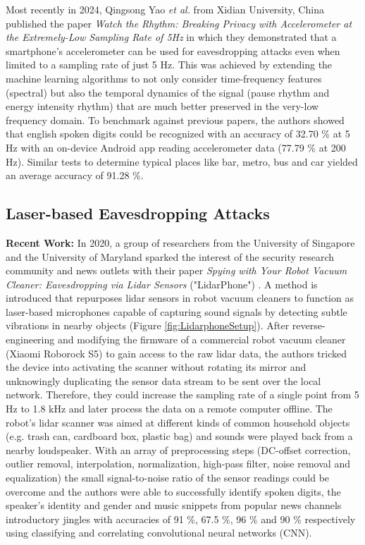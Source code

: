 \documentclass[sigconf, nonacm]{acmart}
\begin{document}
Most recently in 2024, Qingsong Yao \textit{et al.} from Xidian University, China published the paper \textit{Watch the Rhythm: Breaking Privacy with Accelerometer at the Extremely-Low Sampling Rate of 5Hz} \cite{WatchTheRhythm2024} in which they demonstrated that a smartphone's accelerometer can be used for eavesdropping attacks even when limited to a sampling rate of just 5 Hz.
This was achieved by extending the machine learning algorithms to not only consider time-frequency features (spectral) but also the temporal dynamics of the signal (pause rhythm and energy intensity rhythm) that are much better preserved in the very-low frequency domain.
To benchmark against previous papers, the authors showed that english spoken digits could be recognized with an accuracy of 32.70 \% at 5 Hz with an on-device Android app reading accelerometer data (77.79 \% at 200 Hz).
Similar tests to determine typical places like bar, metro, bus and car yielded an average accuracy of 91.28 \%.

\subsection{Laser-based Eavesdropping Attacks}

\textbf{Recent Work:} In 2020, a group of researchers from the University of Singapore and the University of Maryland sparked the interest of the security research community \cite{BitdefenderRobotVacuumEavesdrop} and news outlets \cite{ForbesRobotVacuumEavesdrop} with their paper \textit{Spying with Your Robot Vacuum Cleaner: Eavesdropping via Lidar Sensors} ("LidarPhone") \cite{LidarPhone2020}. A method is introduced that repurposes lidar sensors in robot vacuum cleaners to function as laser-based microphones capable of capturing sound signals by detecting subtle vibrations in nearby objects (Figure \ref{fig:LidarphoneSetup}).
After reverse-engineering and modifying the firmware of a commercial robot vacuum cleaner (Xiaomi Roborock S5) to gain access to the raw lidar data, the authors tricked the device into activating the scanner without rotating its mirror and unknowingly duplicating the sensor data stream to be sent over the local network. Therefore, they could increase the sampling rate of a single point from 5 Hz to 1.8 kHz and later process the data on a remote computer offline.
The robot's lidar scanner was aimed at different kinds of common household objects (e.g. trash can, cardboard box, plastic bag) and sounds were played back from a nearby loudspeaker.
With an array of preprocessing steps (DC-offset correction, outlier removal, interpolation, normalization, high-pass filter, noise removal and equalization) the small signal-to-noise ratio of the sensor readings could be overcome and the authors were able to successfully identify spoken digits, the speaker's identity and gender and music snippets from popular news channels introductory jingles with accuracies of 91 \%, 67.5 \%, 96 \% and 90 \% respectively using classifying and correlating convolutional neural networks (CNN).
\end{document}

